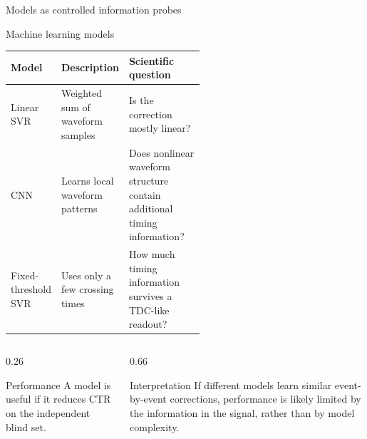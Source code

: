 \begin{frame}{Models as controlled information probes}
\small

\begin{block}{Machine learning models}
\begin{tabularx}{\linewidth}{@{}p{0.22\linewidth}p{0.32\linewidth}X@{}}
\toprule
\textbf{Model} & \textbf{Description} & \textbf{Scientific question}\\
\midrule
Linear SVR
& Weighted sum of waveform samples
& Is the correction mostly linear?\\[1em]

CNN
& Learns local waveform patterns
& Does nonlinear waveform structure contain additional timing information?\\[2.em]

Fixed-threshold SVR
& Uses only a few crossing times
& How much timing information survives a TDC-like readout?\\
\bottomrule
\end{tabularx}
\end{block}
\vspace{0.3em}

\begin{columns}[T,totalwidth=\textwidth]
\begin{column}{0.26\textwidth}
\begin{block}{Performance}
A model is useful if it reduces CTR on the independent blind set.
\end{block}
\end{column}

\begin{column}{0.66\textwidth}
\begin{alertblock}{Interpretation}
If different models learn similar event-by-event corrections,
performance is likely limited by the information in the signal,
rather than by model complexity.
\end{alertblock}
\end{column}
\end{columns}
\end{frame}
